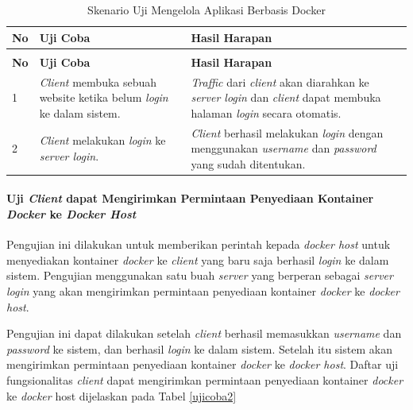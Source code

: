 \begin{longtable}{|p{}|p{}|p{}|}					\caption{Skenario Uji \textit{Client} dapat \textit{Login} ke Dalam Sistem} \label{ujicoba1} \\
	\hline
	\textbf{No} & \textbf{Uji Coba} & \textbf{Hasil Harapan} \\ \hline
	\endfirsthead
	\caption[]{Skenario Uji Mengelola Aplikasi Berbasis Docker} \\
	\hline
	\textbf{No} & \textbf{Uji Coba} & \textbf{Hasil Harapan} \\ \hline
	\endhead
	\endfoot
	\endlastfoot
	
	1 & \textit{Client} membuka sebuah website ketika belum \textit{login} ke dalam sistem. & \textit{Traffic} dari \textit{client} akan diarahkan ke \textit{server login} dan \textit{client} dapat membuka halaman \textit{login} secara otomatis.\\ \hline
	2 & \textit{Client} melakukan \textit{login} ke \textit{server login}. & \textit{Client} berhasil melakukan \textit{login} dengan menggunakan \textit{username} dan \textit{password} yang sudah ditentukan.\\ \hline
\end{longtable}

\paragraph{Uji \textit{Client} dapat Mengirimkan Permintaan Penyediaan Kontainer \textit{Docker} ke \textit{Docker Host}} \label{kedua}
Pengujian ini dilakukan untuk memberikan perintah kepada \textit{docker host} untuk menyediakan kontainer \textit{docker} ke \textit{client} yang baru saja berhasil \textit{login} ke dalam sistem. Pengujian menggunakan satu buah \textit{server} yang berperan sebagai \textit{server login} yang akan mengirimkan permintaan penyediaan kontainer \textit{docker} ke \textit{docker host}.

Pengujian ini dapat dilakukan setelah \textit{client} berhasil memasukkan \textit{username} dan \textit{password} ke sistem, dan berhasil \textit{login} ke dalam sistem. Setelah itu sistem akan mengirimkan permintaan penyediaan kontainer \textit{docker} ke \textit{docker host}. Daftar uji fungsionalitas \textit{client} dapat mengirimkan permintaan penyediaan kontainer \textit{docker} ke \textit{docker} host dijelaskan pada Tabel \ref{ujicoba2}

